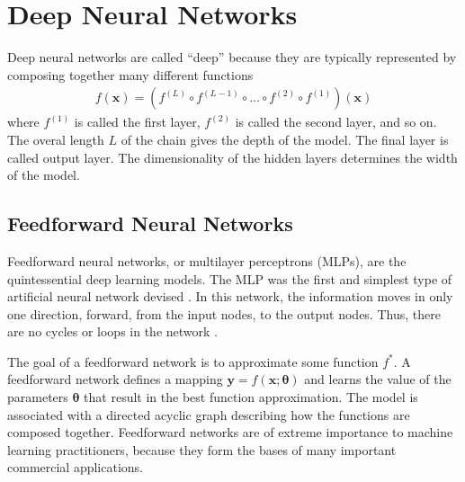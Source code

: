 \documentclass{scrartcl}
\begin{document}



\newpage


\section{Deep Neural Networks}


Deep neural networks are called ``deep'' because they are typically represented by composing together many different functions
\begin{align}
f(\mathbf x) = (f^{(L)} \circ f^{(L-1)} \circ \dots \circ f^{(2)} \circ f^{(1)})(\mathbf x)
\end{align} 
where $f^{(1)}$ is called the first layer, $f^{(2)}$ is called the second layer, and so on. The overal length $L$ of the chain gives the depth of the model. The final layer is called output layer. The dimensionality of the hidden layers determines the width of the model. 

\subsection{Feedforward Neural Networks}

Feedforward neural networks, or multilayer perceptrons (MLPs), are the quintessential deep learning models. The MLP was the first and simplest type of artificial neural network devised \cite{Schmidhuber2015}. In this network, the information moves in only one direction, forward, from the input nodes, to the output nodes. Thus, there are no cycles or loops in the network \cite{Zell1994}.

The goal of a feedforward network is to approximate some function $f^*$. A feedforward network defines a mapping $\mathbf y = f(\mathbf x; \boldsymbol \theta)$ and learns the value of the parameters $\boldsymbol \theta$ that result in the best function approximation. The model is associated with a directed acyclic graph describing how the functions are composed together. Feedforward networks are of extreme importance to machine learning practitioners, because they form the bases of many important commercial applications. 
\end{document}
